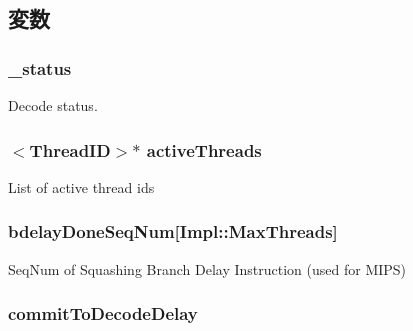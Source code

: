 \subsection{変数}
\hypertarget{classDefaultDecode_a69375c9c0bc115c0f1a90b7967abfa6a}{
\subsubsection[{\_\-status}]{ {\bf \_\-status}}}
\label{classDefaultDecode_a69375c9c0bc115c0f1a90b7967abfa6a}
Decode status. \hypertarget{classDefaultDecode_af6eaea53db532812052f71bf0380dab5}{
\subsubsection[{activeThreads}]{$<${\bf ThreadID}$>$$\ast$ {\bf activeThreads}}}
\label{classDefaultDecode_af6eaea53db532812052f71bf0380dab5}
List of active thread ids \hypertarget{classDefaultDecode_aa7e5b323025273d40b8cba03150ebaee}{
\subsubsection[{bdelayDoneSeqNum}]{ {\bf bdelayDoneSeqNum}\mbox{[}Impl::MaxThreads\mbox{]}}}
\label{classDefaultDecode_aa7e5b323025273d40b8cba03150ebaee}
SeqNum of Squashing Branch Delay Instruction (used for MIPS) \hypertarget{classDefaultDecode_a77f4b17f2ef6c226e894d648ee743fae}{
\subsubsection[{commitToDecodeDelay}]{ {\bf commitToDecodeDelay}}}
